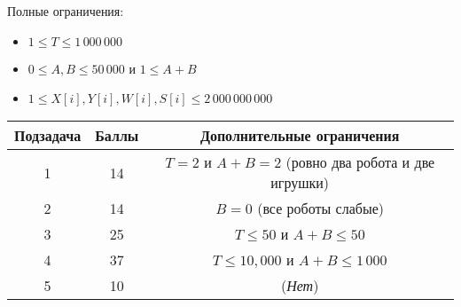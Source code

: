 Полные ограничения:
\begin{itemize}
\item $1 \leq T \leq 1\,000\,000$
\item $0\leq A,B\leq 50\,000$ и $1\leq A+B$
\item $1 \leq X[i], Y[i], W[i], S[i] \leq 2\,000\,000\,000$
\end{itemize}

\begin{center}
\begin{tabular}{ |c|c|c| }
\hline
Подзадача & Баллы & Дополнительные ограничения\\
\hline
1 & 14 & $T=2$ и $A+B=2$ (ровно два робота и две игрушки)\\
\hline
2 & 14 & $B = 0$ (все роботы слабые)\\
\hline
3 & 25 & $T\leq 50$ и $A+B\leq 50$\\
\hline
4 & 37 & $T\leq 10,000$ и $A+B\leq 1\,000$\\
\hline
5 & 10 & (\textit{Нет})\\
\hline
\end{tabular}
\end{center}